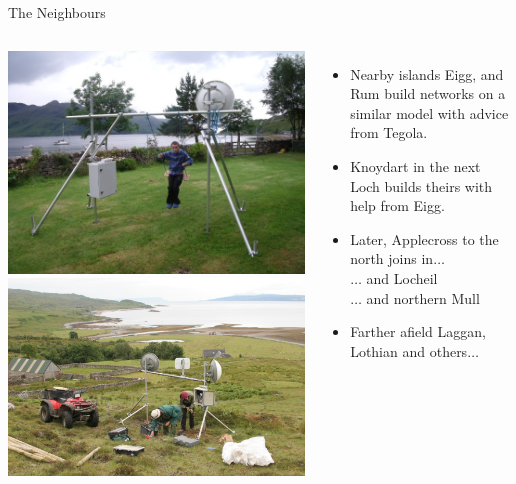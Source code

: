 \documentclass{beamer}
\begin{document}
\begin{frame}{The Neighbours}
  \begin{columns}
    \includegraphics[width=\textwidth]{corran-testing.jpg}\\
    \includegraphics[width=\textwidth]{inver-mast.jpg}\\
    \begin{itemize}
      \item Nearby islands \alert{Eigg}, and \alert{Rum} build
        networks on a similar model with advice from Tegola.
      \item \alert{Knoydart} in the next Loch builds theirs with help
        from Eigg.
      \item Later, \alert{Applecross} to the north joins in$\ldots$\\
        $\ldots$ and \alert{Locheil}\\
        $\ldots$ and northern \alert{Mull}
      \item Farther afield \alert{Laggan}, \alert{Lothian} and
        others$\ldots$
    \end{itemize}
  \end{columns}
\end{frame}
\end{document}
